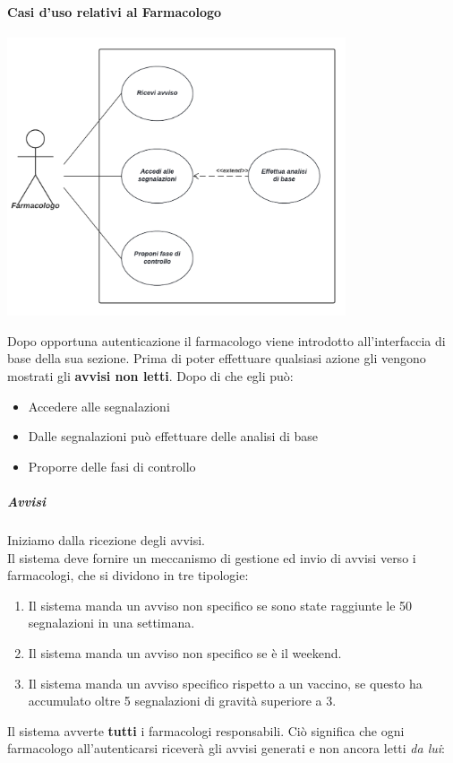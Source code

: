 \documentclass{article}
\begin{document}
\paragraph*{Casi d'uso relativi al Farmacologo}
\begin{center}
    \includegraphics[width=0.75\textwidth]{pictures/CasoDUsoFarmacologo.png}
\end{center}
Dopo opportuna autenticazione il farmacologo viene introdotto all'interfaccia di base della sua sezione. Prima di poter effettuare qualsiasi azione gli vengono mostrati gli \textbf{avvisi non letti}. Dopo di che egli può:
\begin{itemize}
    \item Accedere alle segnalazioni
    \item Dalle segnalazioni può effettuare delle analisi di base
    \item Proporre delle fasi di controllo
\end{itemize}
\subparagraph*{Avvisi}
Iniziamo dalla ricezione degli avvisi.\\
Il sistema deve fornire un meccanismo di gestione ed invio di avvisi verso i
farmacologi, che si dividono in tre tipologie:
\begin{enumerate}
    \item Il sistema manda un avviso non specifico se sono state raggiunte le 50 segnalazioni in una settimana.
    \item Il sistema manda un avviso non specifico se è il weekend.
    \item Il sistema manda un avviso specifico rispetto a un vaccino, se questo ha accumulato oltre 5 segnalazioni di gravità superiore a 3.
\end{enumerate}
Il sistema avverte \textbf{tutti} i farmacologi responsabili. Ciò significa che ogni farmacologo all'autenticarsi riceverà gli avvisi generati e non ancora letti \textit{da lui}:
\end{document}
